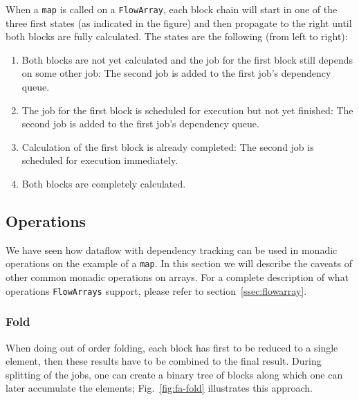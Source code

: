 \documentclass[runningheads,a4paper,fleqn]{llncs}
\begin{document}
When a \texttt{map} is called on a \texttt{FlowArray}, each block chain will
start in one of the three first states (as indicated in the figure)
and then propagate to the right until both blocks are fully
calculated. The states are the following (from left to right):

\begin{enumerate}
\item Both blocks are not yet calculated and the job for the first
  block still depends on some other job: The second job is added to
  the first job's dependency queue.
\item The job for the first block is scheduled for execution but not
  yet finished: The second job is added to the first job's dependency
  queue.
\item Calculation of the first block is already completed: The second
  job is scheduled for execution immediately.
\item Both blocks are completely calculated.
\end{enumerate}

\subsection{Operations}
We have seen how dataflow with dependency tracking can be used in
monadic operations on the example of a \texttt{map}. In this section
we will describe the caveats of other common monadic operations on
arrays. For a complete description of what operations \texttt{FlowArrays}
support, please refer to section~\ref{ssec:flowarray}.

\subsubsection{Fold}
When doing out of order folding, each block has first to be reduced to
a single element, then these results have to be combined to the final
result. During splitting of the jobs, one can create a binary tree of
blocks along which one can later accumulate the elements;
Fig.~\ref{fig:fa-fold} illustrates this approach.
\end{document}
